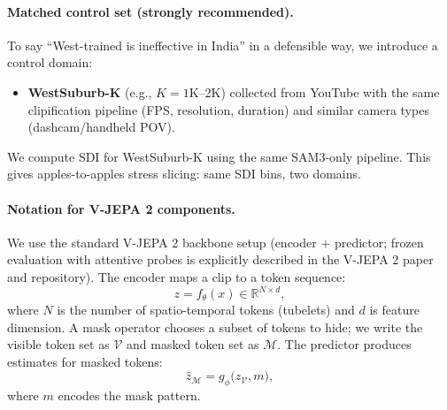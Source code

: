 \paragraph{Matched control set (strongly recommended).}
To say “West-trained is ineffective in India” in a defensible way, we introduce a control domain:
\begin{itemize}[leftmargin=*,itemsep=2pt]
  \item \textbf{WestSuburb-K} (e.g., $K{=}1$K--2K) collected from YouTube with the same clipification pipeline (FPS, resolution, duration) and similar camera types (dashcam/handheld POV).
\end{itemize}
We compute SDI for WestSuburb-K using the same SAM3-only pipeline. This gives apples-to-apples stress slicing: same SDI bins, two domains.

\paragraph{Notation for V-JEPA 2 components.}
We use the standard V-JEPA 2 backbone setup (encoder + predictor; frozen evaluation with attentive probes is explicitly described in the V-JEPA 2 paper and repository). The encoder maps a clip to a token sequence:
\[
z = f_{\theta}(x) \in \mathbb{R}^{N \times d},
\]
where $N$ is the number of spatio-temporal tokens (tubelets) and $d$ is feature dimension. A mask operator chooses a subset of tokens to hide; we write the visible token set as $\mathcal{V}$ and masked token set as $\mathcal{M}$. The predictor produces estimates for masked tokens:
\[
\hat{z}_{\mathcal{M}} = g_{\phi}\big(z_{\mathcal{V}}, m\big),
\]
where $m$ encodes the mask pattern.











